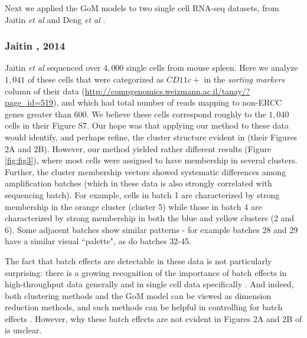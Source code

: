 Next we applied the GoM models to two single cell RNA-seq datasets, from Jaitin \textit{et al} \cite{Jaitin2014} and Deng \textit{et al} \cite{Deng2014}.  

\subsubsection{Jaitin , 2014}

Jaitin \textit{et al} sequenced over $4,000$ single cells from mouse spleen. 
Here we analyze $1,041$ of these cells that were categorized as $CD11c+$ in the \textit{sorting markers} column of their data (\url{http://compgenomics.weizmann.ac.il/tanay/?page_id=519}), and which had total number of reads mapping to non-ERCC genes greater than $600$. We believe these cells correspond roughly to the $1,040$ cells in their Figure S7.   Our hope was that applying our method to these data would identify, and perhaps refine, the cluster structure evident in 
\cite{Jaitin2014} (their Figures 2A and 2B). However, our method yielded rather different results (Figure \ref{fig:fig3}), where most cells were assigned to have membership
in several clusters. Further, the cluster membership vectors showed systematic differences among amplification batches (which in these data is also strongly correlated with sequencing batch). For example, cells in batch 1 are characterized by strong membership in the orange cluster (cluster 5) while those in batch 4 are characterized
by strong membership in both the blue and yellow clusters (2 and 6). Some adjacent batches show similar patterns - for example batches 28 and 29 have a similar visual ``palette", as do batches 32-45. 

The fact that batch effects are detectable in these data is not particularly surprising: there is a growing recognition of the importance of batch effects in high-throughput data generally \cite{Leek2010} and in single cell data specifically \cite{Hicks2015}. And indeed, both clustering methods and the GoM model can be viewed
as dimension reduction methods, and such methods can be helpful in controlling for batch effects \cite{Leek2007} \cite{Stegle2012}. However, why these batch effects are not evident in Figures 2A and 2B of \cite{Jaitin2014} is unclear. 


